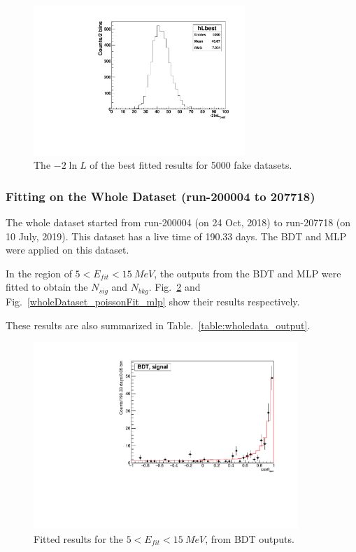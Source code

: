 \begin{figure}[!htb]
	\centering
	\includegraphics[width=8cm]{ensemble_lnLbest.pdf}
	\caption{The $-2\ln L$ of the best fitted results for 5000 fake datasets.}
	\label{poisson_fitLnL}
\end{figure}

\subsubsection{Fitting on the Whole Dataset (run-200004 to 207718)}
The whole dataset started from run-200004 (on 24 Oct, 2018) to run-207718 (on 10 July, 2019). This dataset has a live time of 190.33 days. The BDT and MLP were applied on this dataset.

In the region of $5<E_{fit}<15~MeV$, the outputs from the BDT and MLP were fitted to obtain the $N_{sig}$ and $N_{bkg}$. Fig.~\ref{wholeDataset_poissonFit_bdt} and Fig.~\ref{wholeDataset_poissonFit_mlp} show their results respectively.

These results are also summarized in Table.~\ref{table:wholedata_output}.

\begin{figure}[!htb]
	\centering
	\includegraphics[width=10cm]{wholedataFit_bdt.pdf}
	\caption{Fitted results for the $5<E_{fit}<15~MeV$, from BDT outputs.} \label{wholeDataset_poissonFit_bdt}
\end{figure} 

